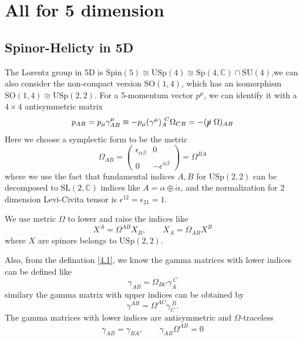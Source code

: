 \documentclass[12pt]{article}
\begin{document}
\section{All for 5 dimension}
\subsection{Spinor-Helicty in 5D}
The Lorentz group in 5D is $\textrm{Spin}(5)\cong \mathrm{USp}(4)\cong \mathrm{Sp}(4,\mathbb{C} )\cap \mathrm{SU}(4) $,we can also consider the non-compact version $\mathrm{SO}(1,4)$, which has an isomorphism $\mathrm{SO}(1,4)\cong \mathrm{USp}(2,2)$. For a 5-momentum vector $p^\mu$, we can identify it with a $4\times 4$ antisymmetric matrix
\begin{equation}
    p_{AB}=p_\mu\gamma^\mu_{AB}\equiv -p_\mu (\gamma^\mu)_A^{\ C}\Omega_{CB}=-(\cancel{p}\ \Omega)_{AB}
    \label{4.1}
\end{equation}
Here we choose a symplectic form to be the metric
\begin{equation}
    \Omega_{AB}=\begin{pmatrix}
        \epsilon_{\alpha\beta} & 0 \\
        0 & -\epsilon^{\dot{\alpha}\dot{\beta}}
    \end{pmatrix}= \Omega^{BA}
\end{equation}
where we use the fact that fundamental indices $A,B$ for $\mathrm{USp}(2,2)$ can be decomposed to $\mathrm{SL}(2,\mathbb{C})$ indices like $A=\alpha\oplus \dot{\alpha} $, and the normalization for 2 dimension Levi-Civita tensor is $\epsilon^{12}=\epsilon_{21}=1$.

We use metric $\Omega$ to lower and raise the indices like 
\begin{equation}
    X^A=\Omega^{AB}X_B,\qquad X_A=\Omega_{AB}X^B
\end{equation} 
where $X$ are spinors belongs to $\mathrm{USp}(2,2)$.

Also, from the defination \eqref{4.1}, we know the gamma matrices with lower indices can be defined like 
\begin{equation}
    \gamma_{AB}=\Omega_{BC}\gamma_A^{\ C}
\end{equation}
similary the gamma matrix with upper indices can be obtained by
\begin{equation}
    \gamma^{AB}=\Omega^{AC}\gamma_C^{\ B}.
\end{equation}
The gamma matrices with lower indices are antisymmetric and $\Omega$-traceless
\begin{equation}
    \gamma_{AB}=\gamma_{BA},\qquad \gamma_{AB}\Omega^{AB}=0
\end{equation}
\end{document}

